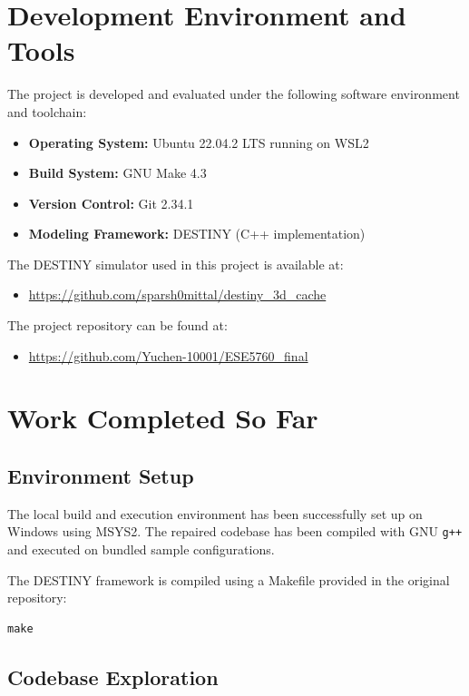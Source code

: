 \documentclass[11pt]{article}
\begin{document}
\section{Development Environment and Tools}

The project is developed and evaluated under the following software environment and toolchain:

\begin{itemize}
    \item \textbf{Operating System:} Ubuntu 22.04.2 LTS running on WSL2
    \item \textbf{Build System:} GNU Make 4.3
    \item \textbf{Version Control:} Git 2.34.1
    \item \textbf{Modeling Framework:} DESTINY (C++ implementation)
\end{itemize}

The DESTINY simulator used in this project is available at:
\begin{itemize}
    \item \url{https://github.com/sparsh0mittal/destiny_3d_cache}
\end{itemize}

The project repository can be found at:
\begin{itemize}
    \item \url{https://github.com/Yuchen-10001/ESE5760_final}
\end{itemize}

\section{Work Completed So Far}

\subsection{Environment Setup}

The local build and execution environment has been successfully set up on Windows using MSYS2. The repaired codebase has been compiled with GNU \texttt{g++} and executed on bundled sample configurations.

The DESTINY framework is compiled using a Makefile provided in the original repository:

\begin{verbatim}
make
\end{verbatim}

\subsection{Codebase Exploration}
\end{document}
